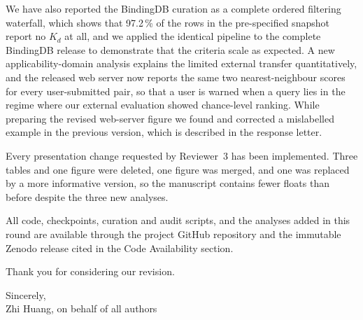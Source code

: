 \documentclass[11pt]{article}
\begin{document}
We have also reported the BindingDB curation as a complete ordered filtering
waterfall, which shows that 97.2\,\% of the rows in the pre-specified snapshot
report no $K_d$ at all, and we applied the identical pipeline to the complete
BindingDB release to demonstrate that the criteria scale as expected.  A new
applicability-domain analysis explains the limited external transfer
quantitatively, and the released web server now reports the same two
nearest-neighbour scores for every user-submitted pair, so that a user is warned
when a query lies in the regime where our external evaluation showed
chance-level ranking.  While preparing the revised web-server figure we found
and corrected a mislabelled example in the previous version, which is described
in the response letter.

Every presentation change requested by Reviewer~3 has been implemented.  Three
tables and one figure were deleted, one figure was merged, and one was replaced
by a more informative version, so the manuscript contains fewer floats than
before despite the three new analyses.

All code, checkpoints, curation and audit scripts, and the analyses added in this
round are available through the project GitHub repository and the immutable
Zenodo release cited in the Code Availability section.

Thank you for considering our revision.

\vspace{1em}
\noindent Sincerely,\\
Zhi Huang, on behalf of all authors
\end{document}

